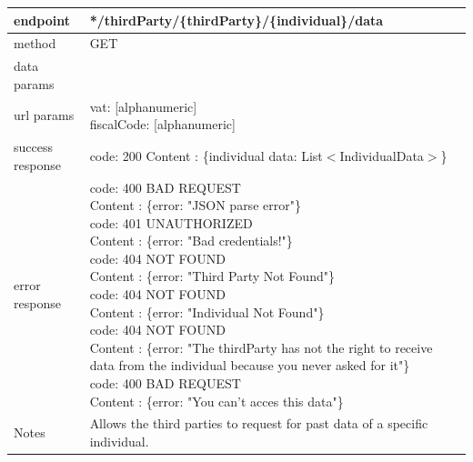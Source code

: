 \begin{legal}
\begin{legal}
\begin{itemize}
								\begin{tabularx}{\linewidth}{| l| l }
									\hline
									endpoint & */thirdParty/\{thirdParty\}/\{individual\}/data \\
									\hline
									method & GET \\
									\hline
									data params & \\
									\hline
									url params &
									\parbox{0.7\textwidth}{
										\bigskip
										vat: [alphanumeric]\\
										fiscalCode: [alphanumeric]
										\bigskip
									} \\
									\hline
									success response &
									\parbox{0.7\textwidth}{
										\bigskip
										code: 200\\
										Content : \{individual data: List$<$IndividualData$>$\}
										\bigskip
									} \\
									\hline
									error response &
									\parbox{0.7\textwidth}{
										\bigskip
										code: 400 BAD REQUEST \\
										Content : \{error: "JSON parse error"\}\\
										code: 401 UNAUTHORIZED \\
										Content : \{error: "Bad credentials!"\}\\
										code: 404 NOT FOUND \\
										Content : \{error: "Third Party Not Found"\}\\
										code: 404 NOT FOUND \\
										Content : \{error: "Individual Not Found"\}\\
										code: 404 NOT FOUND \\
										Content : \{error: "The thirdParty has not the right to receive data from the individual because you never asked for it"\}\\
										code: 400 BAD REQUEST \\
										Content : \{error: "You can't acces this data"\}\\
										\bigskip
									} \\
									\hline
									Notes & 
									\parbox{0.7\textwidth}{
										\bigskip Allows the third parties to request for past data of a specific individual.
									\bigskip}  \\
									\hline
								\end{tabularx}\\
								

\end{itemize}
\end{legal}
\end{legal}
